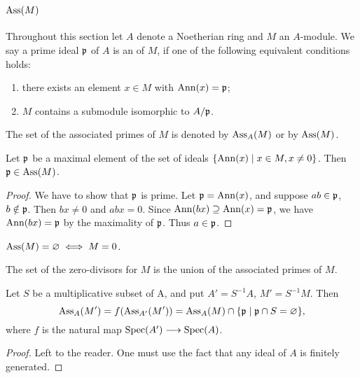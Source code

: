 \documentclass[../main]{subfiles}
\begin{document}
\section{\texorpdfstring{$\operatorname{Ass}(M)$}{Ass(M)}}\label{sec:07}


\newparagraph Throughout this section let $A$ denote a Noetherian ring and $M$ an $A$-module. We say a prime ideal $\mathfrak{p}$ of $A$ is an  of $M$, if one of the following equivalent
conditions holds:
\begin{enumerate}[label=(\roman*)]
    \item there exists an element $x\in M$ with $\operatorname{Ann}(x)=\mathfrak{p}$;
    \item $M$ contains a submodule isomorphic to $A/\mathfrak{p}$.
\end{enumerate}
The set of the associated primes of $M$ is denoted by $\operatorname{Ass}_A(M)$ or by $\operatorname{Ass}(M)$.

\begin{parproposition}\label{pro:07.01}
Let $\mathfrak{p}$ be a maximal element of the set of ideals $\{\operatorname{Ann}(x)\mid x\in M,x\neq0\}$. Then $\mathfrak{p}\in\operatorname{Ass}(M)$.
\end{parproposition}

\begin{proof}
We have to show that $\mathfrak{p}$ is prime. Let $\mathfrak{p}=\operatorname{Ann}(x)$, and suppose $ab\in\mathfrak{p}$, $b\notin\mathfrak{p}$. Then $bx\neq0$ and $abx = 0$. Since $\operatorname{Ann}(bx)\supseteq\operatorname{Ann}(x)=\mathfrak{p}$, we have $\operatorname{Ann}(bx)=\mathfrak{p}$ by the maximality of $\mathfrak{p}$. Thus $a\in \mathfrak{p}$.
\end{proof}

\begin{corollary}\label{cor:07.01}
$\operatorname{Ass}(M)=\varnothing\iff M=0$.
\end{corollary}

\begin{corollary}\label{cor:07.02}
The set of the zero-divisors for $M$ is the union of the associated primes of $M$.
\end{corollary}

\begin{parlemma}\label{lem:07.01}
Let $S$ be a multiplicative subset of A, and put $A'=S^{-1}A$, $M'=S^{-1}M$. Then \[\operatorname{Ass}_A(M')=f(\operatorname{Ass}_{A'}(M'))=\operatorname{Ass}_A(M)\cap\{\mathfrak{p}\mid\mathfrak{p}\cap S=\varnothing\},\] where $f$ is the natural map $\operatorname{Spec}(A')\longrightarrow\operatorname{Spec}(A)$.
\end{parlemma}

\begin{proof} \renewcommand{\qedsymbol}{}
Left to the reader. One must use the fact that any ideal of $A$ is finitely generated.
\end{proof} 
\end{document}
